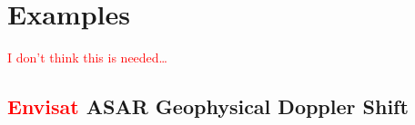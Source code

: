 \section{Examples}

\textcolor{red}{I don't think this is needed\ldots}

\subsection{\textcolor{red}{Envisat} \ac{ASAR} Geophysical Doppler Shift}





%
%
%
%

